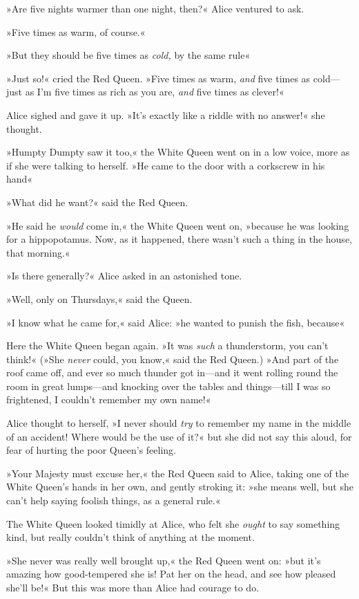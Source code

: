 »Are five nights warmer than one night, then?« Alice ventured to ask.

»Five times as warm, of course.«

»But they should be five times as \textit{cold,} by the same rule\longdash«

»Just so!« cried the Red Queen. »Five times as warm, \textit{and} five times as cold—just as I'm five times as rich as you are, \textit{and} five times as clever!«

Alice sighed and gave it up. »It's exactly like a riddle with no answer!« she thought.

»Humpty Dumpty saw it too,« the White Queen went on in a low voice, more as if she were talking to herself. »He came to the door with a corkscrew in his hand\longdash«

»What did he want?« said the Red Queen.

»He said he \textit{would} come in,« the White Queen went on, »because he was looking for a hippopotamus. Now, as it happened, there wasn't such a thing in the house, that morning.«

»Is there generally?« Alice asked in an astonished tone.

»Well, only on Thursdays,« said the Queen.

»I know what he came for,« said Alice: »he wanted to punish the fish, because\longdash«

Here the White Queen began again. »It was \textit{such} a thunderstorm, you can't think!« (»She \textit{never} could, you know,« said the Red Queen.) »And part of the roof came off, and ever so much thunder got in—and it went rolling round the room in great lumps—and knocking over the tables and things—till I was so frightened, I couldn't remember my own name!«

Alice thought to herself, »I never should \textit{try} to remember my name in the middle of an accident! Where would be the use of it?« but she did not say this aloud, for fear of hurting the poor Queen's feeling.

»Your Majesty must excuse her,« the Red Queen said to Alice, taking one of the White Queen's hands in her own, and gently stroking it: »she means well, but she can't help saying foolish things, as a general rule.«

The White Queen looked timidly at Alice, who felt she \textit{ought} to say something kind, but really couldn't think of anything at the moment.

»She never was really well brought up,« the Red Queen went on: »but it's amazing how good-tempered she is! Pat her on the head, and see how pleased she'll be!« But this was more than Alice had courage to do.

